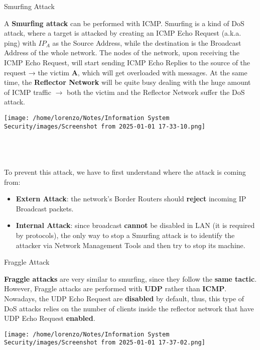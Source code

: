 \begin{quotebox-grey}{Smurfing Attack}
    \begin{minipage}{0.6\textwidth}
    A \textbf{Smurfing attack} can be performed with ICMP. Smurfing is a kind of DoS attack, where a
    target is attacked by creating an ICMP Echo Request (a.k.a. ping) with \(IP_A\) as the Source
    Address, while the destination is the Broadcast Address of the whole network. The nodes of
    the network, upon receiving the ICMP Echo Request, will start sending ICMP Echo Replies
    to the source of the request → the victim \textbf{A}, which will get overloaded with messages. At the
    same time, the \textbf{Reflector Network} will be quite busy dealing with the huge amount of ICMP
    traffic \(\rightarrow \) both the victim and the Reflector Network suffer the DoS attack.
    
    \end{minipage} 
    \hspace{0.3cm}
    \begin{minipage}{0.4\textwidth}
        \centering
        \texttt{[image: /home/lorenzo/Notes/Information System Security/images/Screenshot from 2025-01-01 17-33-10.png]}
    \end{minipage}
    \\  \\
    \\
    To prevent this attack, we have to first understand where the attack is coming from:
    \begin{itemize}
        \item \textbf{Extern Attack}: the network’s Border Routers should \textbf{reject} incoming IP Broadcast packets.
        \item \textbf{Internal Attack}: since broadcast \textbf{cannot} be disabled in LAN (it is required by protocols), the only way to stop a Smurfing attack is to identify the attacker via Network Management Tools and then try to stop its machine.
    \end{itemize}
\end{quotebox-grey}
\begin{quotebox-grey}{Fraggle Attack}
    \begin{minipage}{0.6\textwidth}
    \vspace{-1.5cm}
    \textbf{Fraggle attacks} are very similar to smurfing, since they follow the \textbf{same tactic}. However,
    Fraggle attacks are performed with \textbf{UDP} rather than \textbf{ICMP}. Nowadays, the UDP Echo
    Request are \textbf{disabled} by default, thus, this type of DoS attacks relies on the number of clients
    inside the reflector network that have UDP Echo Request \textbf{enabled}. 
    \end{minipage} 
    \hspace{0.3cm}
    \begin{minipage}{0.4\textwidth}
        \centering
        \texttt{[image: /home/lorenzo/Notes/Information System Security/images/Screenshot from 2025-01-01 17-37-02.png]}
    \end{minipage}

\end{quotebox-grey}

